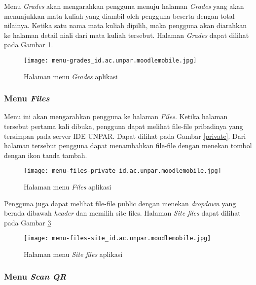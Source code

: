 Menu \textit{Grades} akan mengarahkan pengguna menuju halaman \textit{Grades} yang akan menunjukkan mata kuliah yang diambil oleh pengguna beserta dengan total nilainya. Ketika satu nama mata kuliah dipilih, maka pengguna akan diarahkan ke halaman detail niali dari mata kuliah tersebut. Halaman \textit{Grades} dapat dilihat pada Gambar \ref{app:menu:grades}.

\begin{figure}[H] 
	\centering  
	\texttt{[image: menu-grades\_id.ac.unpar.moodlemobile.jpg]}  
	\caption[Halaman menu \textit{Grades} aplikasi] {Halaman menu \textit{Grades} aplikasi} 
	\label{app:menu:grades} 
\end{figure}  

\subsubsection{Menu \textit{Files}}
\label{menu-files}

Menu ini akan mengarahkan pengguna ke halaman \textit{Files}. Ketika halaman tersebut pertama kali dibuka, pengguna dapat melihat file-file pribadinya yang tersimpan pada server IDE UNPAR. Dapat dilihat pada Gambar \ref{private}. Dari halaman tersebut pengguna dapat menambahkan file-file dengan menekan tombol dengan ikon tanda tambah.


\begin{figure}[H] 
	\centering  
	\texttt{[image: menu-files-private\_id.ac.unpar.moodlemobile.jpg]}  
	\caption[Halaman menu \textit{Files} aplikasi] {Halaman menu \textit{Files} aplikasi} 
	\label{app:menu:files:private} 
\end{figure}  

 Pengguna juga dapat melihat file-file public dengan menekan \textit{dropdown} yang berada dibawah \textit{header} dan memilih site files. Halaman \textit{Site files} dapat dilihat pada Gambar \ref{app:menu:files:site}

\begin{figure}[H] 
	\centering  
	\texttt{[image: menu-files-site\_id.ac.unpar.moodlemobile.jpg]}  
	\caption[Halaman menu \textit{Site files} aplikasi] {Halaman menu \textit{Site files} aplikasi} 
	\label{app:menu:files:site} 
\end{figure}  

\subsubsection{Menu \textit{Scan QR}}

